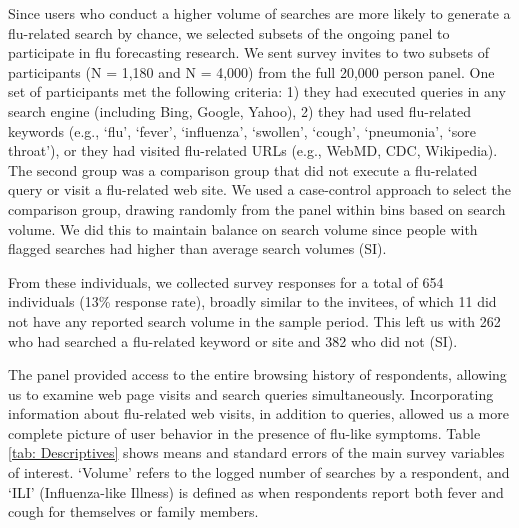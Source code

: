 \documentclass[fleqn,10pt]{wlscirep}
\begin{document}
Since users who conduct a higher volume of searches are more likely to generate a flu-related search by chance, we selected subsets of the ongoing panel to participate in flu forecasting research. We sent survey invites to two subsets of participants (N = 1,180 and N = 4,000) from the full 20,000 person panel. One set of participants met the following criteria: 1) they had executed queries in any search engine (including Bing, Google, Yahoo), 2) they had used flu-related keywords (e.g., `flu', `fever', `influenza', `swollen', `cough', `pneumonia', `sore throat'), or they had visited flu-related URLs (e.g., WebMD, CDC, Wikipedia). The second group was a comparison group that did not execute a flu-related query or visit a flu-related web site. We used a case-control approach to select the comparison group, drawing randomly from the panel within bins based on search volume. We did this to maintain balance on search volume since people with flagged searches had higher than average search volumes (SI).

From these individuals, we collected survey responses for a total of 654 individuals (13\% response rate), broadly similar to the invitees, of which 11 did not have any reported search volume in the sample period. This left us with 262 who had searched a flu-related keyword or site and 382 who did not (SI). 

The panel provided access to the entire browsing history of respondents, allowing us to examine web page visits and search queries simultaneously. Incorporating information about flu-related web visits, in addition to queries, allowed us a more complete picture of user behavior in the presence of flu-like symptoms. Table \ref{tab: Descriptives} shows means and standard errors of the main survey variables of interest. `Volume' refers to the logged number of searches by a respondent, and `ILI' (Influenza-like Illness) is defined as when respondents report both fever and cough for themselves or family members.
\end{document}
